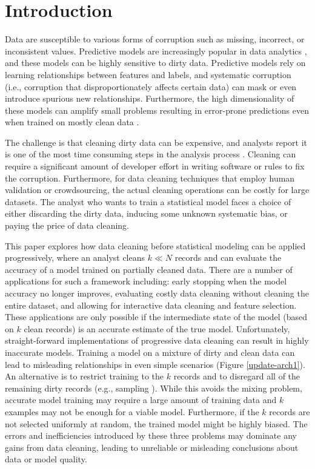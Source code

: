 \section{Introduction}
Data are susceptible to various forms of corruption such as missing, incorrect, or inconsistent values.
Predictive models are increasingly popular in data analytics \cite{bdas, alexandrov2014stratosphere, crotty2014tupleware, hellerstein2012madlib}, and these models can be highly sensitive to dirty data.
Predictive models rely on learning relationships between features and labels, and systematic corruption \cite{taylor1982introduction} (i.e., corruption that disproportionately affects certain data) can mask or even introduce spurious new relationships.
Furthermore, the high dimensionality of these models can amplify small problems resulting in error-prone predictions even when trained on mostly clean data \cite{xiaofeature}.

The challenge is that cleaning dirty data can be expensive, and analysts report it is one of the most time consuming steps in the analysis process \cite{nytimes}.
Cleaning can require a significant amount of developer effort in writing software or rules to fix the corruption.
Furthermore, for data cleaning techniques that employ human validation or crowdsourcing, the actual cleaning operations can be costly for large datasets.
The analyst who wants to train a statistical model faces a choice of either discarding the dirty data, inducing some unknown systematic bias, or paying the price of data cleaning.

This paper explores how data cleaning before statistical modeling can be applied progressively, where an analyst cleans $k \ll N$ records and can evaluate the accuracy of a model trained on partially cleaned data.
There are a number of applications for such a framework including: early stopping when the model accuracy no longer improves, evaluating costly data cleaning without cleaning the entire dataset, and allowing for interactive data cleaning and feature selection.
These applications are only possible if the intermediate state of the model (based on $k$ clean records) is an accurate estimate of the true model.
Unfortunately, straight-forward implementations of progressive data cleaning can result in highly inaccurate models.
Training a model on a mixture of dirty and clean data can lead to misleading relationships in even simple scenarios (Figure \ref{update-arch1}).
An alternative is to restrict training to the $k$ records and to disregard all of the remaining dirty records (e.g., sampling \cite{wang1999sample}).
While this avoids the mixing problem, accurate model training may require a large amount of training data and $k$ examples may not be enough for a viable model.
Furthermore, if the $k$ records are not selected uniformly at random, the trained model might be highly biased.
The errors and inefficiencies introduced by these three problems may dominate any gains from data cleaning, leading to unreliable or misleading conclusions about data or model quality.

